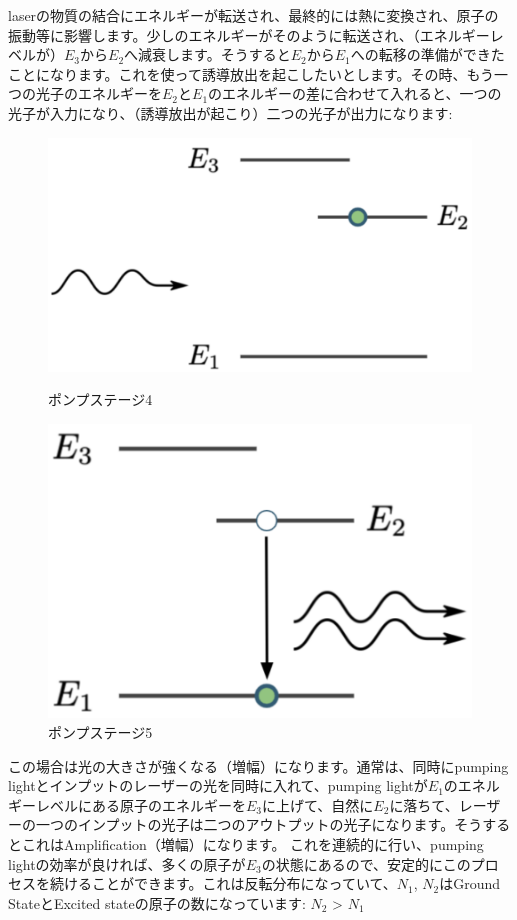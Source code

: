 laserの物質の結合にエネルギーが転送され、最終的には熱に変換され、原子の振動等に影響します。少しのエネルギーがそのように転送され、（エネルギーレベルが）$E_3$から$E_2$へ減衰します。そうすると$E_2$から$E_1$への転移の準備ができたことになります。これを使って誘導放出を起こしたいとします。その時、もう一つの光子のエネルギーを$E_2$と$E_1$のエネルギーの差に合わせて入れると、一つの光子が入力になり、（誘導放出が起こり）二つの光子が出力になります:
\begin{figure}[H]
  \centering
  \begin{minipage}[b]{0.4\textwidth}
    \includegraphics[width=\textwidth]{lesson5/stage4.pdf}
    \caption{ポンプステージ4}
  \end{minipage}
  \hfill
  \begin{minipage}[b]{0.4\textwidth}
    \includegraphics[width=\textwidth]{lesson5/stage5.pdf}
    \caption{ポンプステージ5}
  \end{minipage}
\end{figure}
この場合は光の大きさが強くなる（増幅）になります。通常は、同時にpumping lightとインプットのレーザーの光を同時に入れて、pumping lightが$E_1$のエネルギーレベルにある原子のエネルギーを$E_3$に上げて、自然に$E_2$に落ちて、レーザーの一つのインプットの光子は二つのアウトプットの光子になります。そうするとこれはAmplification（増幅）になります。
これを連続的に行い、pumping lightの効率が良ければ、多くの原子が$E_3$の状態にあるので、安定的にこのプロセスを続けることができます。これは反転分布になっていて、$N_1$, $N_2$はGround StateとExcited stateの原子の数になっています: $N_2$ > $N_1$
\pagebreak
